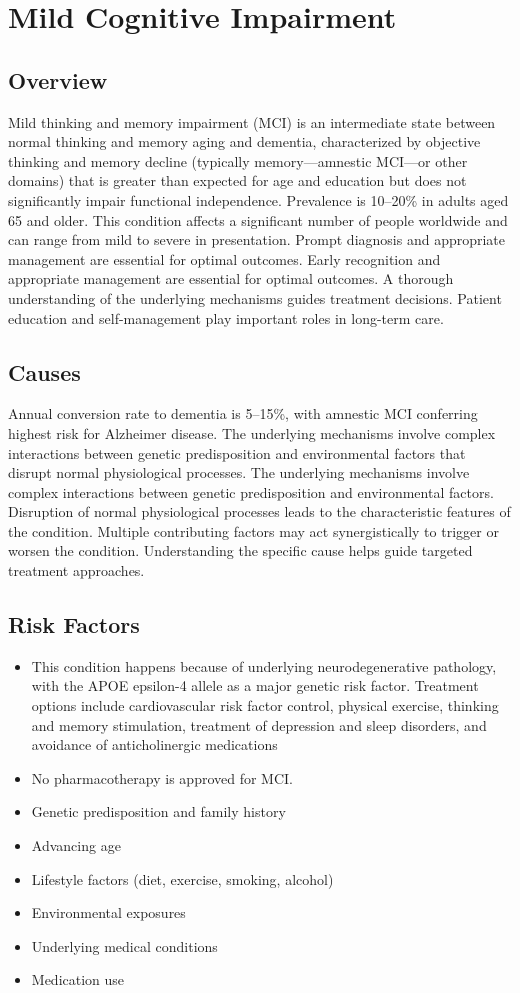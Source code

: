 \chapter{Mild Cognitive Impairment}
\label{sec:Mild Cognitive Impairment}

\section{Overview}
Mild thinking and memory impairment (MCI) is an intermediate state between normal thinking and memory aging and dementia, characterized by objective thinking and memory decline (typically memory---amnestic MCI---or other domains) that is greater than expected for age and education but does not significantly impair functional independence. Prevalence is 10--20\% in adults aged 65 and older. This condition affects a significant number of people worldwide and can range from mild to severe in presentation. Prompt diagnosis and appropriate management are essential for optimal outcomes. Early recognition and appropriate management are essential for optimal outcomes. A thorough understanding of the underlying mechanisms guides treatment decisions. Patient education and self-management play important roles in long-term care.
\section{Causes}
Annual conversion rate to dementia is 5--15\%, with amnestic MCI conferring highest risk for Alzheimer disease. The underlying mechanisms involve complex interactions between genetic predisposition and environmental factors that disrupt normal physiological processes. The underlying mechanisms involve complex interactions between genetic predisposition and environmental factors. Disruption of normal physiological processes leads to the characteristic features of the condition. Multiple contributing factors may act synergistically to trigger or worsen the condition. Understanding the specific cause helps guide targeted treatment approaches.
\section{Risk Factors}
\begin{itemize}[noitemsep]
  \item This condition happens because of underlying neurodegenerative pathology, with the APOE epsilon-4 allele as a major genetic risk factor. Treatment options include cardiovascular risk factor control, physical exercise, thinking and memory stimulation, treatment of depression and sleep disorders, and avoidance of anticholinergic medications
  \item No pharmacotherapy is approved for MCI.
  \item Genetic predisposition and family history
  \item Advancing age
  \item Lifestyle factors (diet, exercise, smoking, alcohol)
  \item Environmental exposures
  \item Underlying medical conditions
  \item Medication use
\end{itemize}
